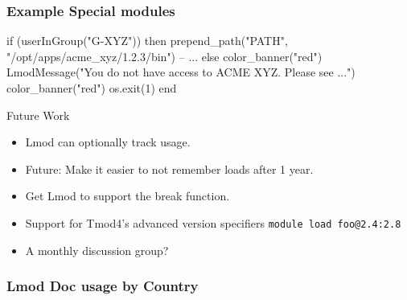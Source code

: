 \documentclass{beamer}
\begin{document}
\begin{frame}[fragile]
\frametitle{Example Special modules}
{\tiny
\begin{semiverbatim}
    if (userInGroup("G-XYZ")) then
       prepend\_path("PATH", "/opt/apps/acme\_xyz/1.2.3/bin")
       -- ...
    else
       color\_banner("red")
       LmodMessage("You do not have access to ACME XYZ.  Please see ...")
       color\_banner("red")
       os.exit(1)
    end
\end{semiverbatim}
}
\end{frame}


\begin{frame}{Future Work}
  \begin{itemize}
    \item Lmod can optionally track usage.
    \item Future: Make it easier to not remember loads after 1 year.
    \item Get Lmod to support the break function.
    \item Support for Tmod4's advanced version specifiers
      \texttt{module load foo@2.4:2.8}
    \item A monthly discussion group?
  \end{itemize}
\end{frame}


\begin{frame}[fragile]
    \frametitle{Lmod Doc usage by Country}
\end{frame}
\end{document}
